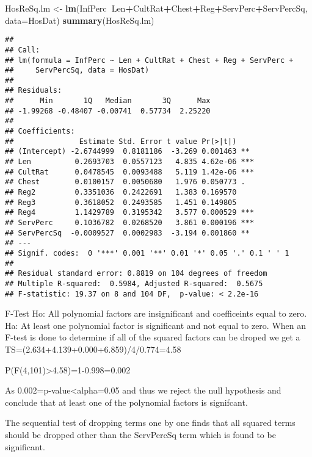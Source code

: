\documentclass[]{article}
\newenvironment{Shaded}{\begin{snugshade}}{\end{snugshade}}
\newcommand{\KeywordTok}[1]{\textcolor[rgb]{0.13,0.29,0.53}{\textbf{#1}}}
\newcommand{\DataTypeTok}[1]{\textcolor[rgb]{0.13,0.29,0.53}{#1}}
\newcommand{\StringTok}[1]{\textcolor[rgb]{0.31,0.60,0.02}{#1}}
\newcommand{\OperatorTok}[1]{\textcolor[rgb]{0.81,0.36,0.00}{\textbf{#1}}}
\newcommand{\NormalTok}[1]{#1}
\begin{document}
\begin{Shaded}
\begin{Highlighting}[]
\NormalTok{HosReSq.lm <-}\StringTok{ }\KeywordTok{lm}\NormalTok{(InfPerc}\OperatorTok{~}\NormalTok{Len}\OperatorTok{+}\NormalTok{CultRat}\OperatorTok{+}\NormalTok{Chest}\OperatorTok{+}\NormalTok{Reg}\OperatorTok{+}\NormalTok{ServPerc}\OperatorTok{+}\NormalTok{ServPercSq, }\DataTypeTok{data=}\NormalTok{HosDat)}
\KeywordTok{summary}\NormalTok{(HosReSq.lm)}
\end{Highlighting}
\end{Shaded}

\begin{verbatim}
## 
## Call:
## lm(formula = InfPerc ~ Len + CultRat + Chest + Reg + ServPerc + 
##     ServPercSq, data = HosDat)
## 
## Residuals:
##      Min       1Q   Median       3Q      Max 
## -1.99268 -0.48407 -0.00741  0.57734  2.25220 
## 
## Coefficients:
##               Estimate Std. Error t value Pr(>|t|)    
## (Intercept) -2.6744999  0.8181186  -3.269 0.001463 ** 
## Len          0.2693703  0.0557123   4.835 4.62e-06 ***
## CultRat      0.0478545  0.0093488   5.119 1.42e-06 ***
## Chest        0.0100157  0.0050680   1.976 0.050773 .  
## Reg2         0.3351036  0.2422691   1.383 0.169570    
## Reg3         0.3618052  0.2493585   1.451 0.149805    
## Reg4         1.1429789  0.3195342   3.577 0.000529 ***
## ServPerc     0.1036782  0.0268520   3.861 0.000196 ***
## ServPercSq  -0.0009527  0.0002983  -3.194 0.001860 ** 
## ---
## Signif. codes:  0 '***' 0.001 '**' 0.01 '*' 0.05 '.' 0.1 ' ' 1
## 
## Residual standard error: 0.8819 on 104 degrees of freedom
## Multiple R-squared:  0.5984, Adjusted R-squared:  0.5675 
## F-statistic: 19.37 on 8 and 104 DF,  p-value: < 2.2e-16
\end{verbatim}

F-Test Ho: All polynomial factors are insignificant and coefficeints
equal to zero. Ha: At least one polynomial factor is significant and not
equal to zero. When an F-test is done to determine if all of the squared
factors can be droped we get a TS=(2.634+4.139+0.000+6.859)/4/0.774=4.58

P(F(4,101)\textgreater{}4.58)=1-0.998=0.002

As 0.002=p-value\textless{}alpha=0.05 and thus we reject the null
hypothesis and conclude that at least one of the polynomial factors is
signifcant.

The sequential test of dropping terms one by one finds that all squared
terms should be dropped other than the ServPercSq term which is found to
be significant.
\end{document}
